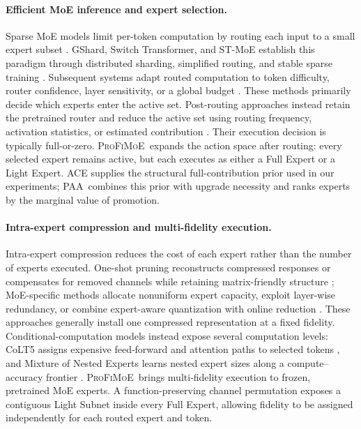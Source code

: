 \documentclass{article}
\newcommand{\PAA}{\textsc{PAA}}
\newcommand{\method}{\textsc{ProFiMoE}}
\begin{document}
\paragraph{Efficient MoE inference and expert selection.}
Sparse MoE models limit per-token computation by routing each input to a small expert subset \citep{shazeer2017outrageously}. GShard, Switch Transformer, and ST-MoE establish this paradigm through distributed sharding, simplified routing, and stable sparse training \citep{lepikhin2021gshard,fedus2022switch,zoph2022stmoe}. Subsequent systems adapt routed computation to token difficulty, router confidence, layer sensitivity, or a global budget \citep{huang2024harder,zhao2025adak,guo2025dynmoe,liu2026allocmoe}. These methods primarily decide which experts enter the active set. Post-routing approaches instead retain the pretrained router and reduce the active set using routing frequency, activation statistics, or estimated contribution \citep{lu2024notall,xie2024moepruner,lasby2025reap,liu2026aimer}. Their execution decision is typically full-or-zero. \method\ expands the action space after routing: every selected expert remains active, but each executes as either a Full Expert or a Light Expert. ACE \citep{xu2026aceadaptivecalibrationfreeexpert} supplies the structural full-contribution prior used in our experiments; \PAA\ combines this prior with upgrade necessity and ranks experts by the marginal value of promotion.

\paragraph{Intra-expert compression and multi-fidelity execution.}
Intra-expert compression reduces the cost of each expert rather than the number of experts executed. One-shot pruning reconstructs compressed responses or compensates for removed channels while retaining matrix-friendly structure \citep{frantar2023sparsegpt,an2024flap}; MoE-specific methods allocate nonuniform expert capacity, exploit layer-wise redundancy, or combine expert-aware quantization with online reduction \citep{bai2025diep,huang2025mixture}. These approaches generally install one compressed representation at a fixed fidelity. Conditional-computation models instead expose several computation levels: CoLT5 assigns expensive feed-forward and attention paths to selected tokens \citep{ainslie2023colt5}, and Mixture of Nested Experts learns nested expert sizes along a compute--accuracy frontier \citep{jain2024mixture}. \method\ brings multi-fidelity execution to frozen, pretrained MoE experts. A function-preserving channel permutation exposes a contiguous Light Subnet inside every Full Expert, allowing fidelity to be assigned independently for each routed expert and token.
\end{document}
